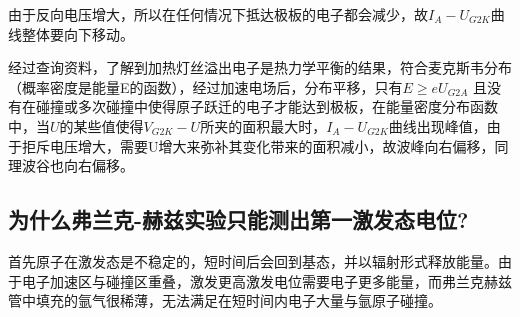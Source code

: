 \documentclass{ctexart}
\begin{document}
由于反向电压增大，所以在任何情况下抵达极板的电子都会减少，故$I_A-U_{G2K}$曲线整体要向下移动。

经过查询资料，了解到加热灯丝溢出电子是热力学平衡的结果，符合麦克斯韦分布（概率密度是能量E的函数），经过加速电场后，分布平移，只有$E \geq e U_{G2A}$ 且没有在碰撞或多次碰撞中使得原子跃迁的电子才能达到极板，在能量密度分布函数中，当$U$的某些值使得$V_{G2K}-U$所夹的面积最大时，$I_A{-}U_{G2K}$曲线出现峰值，由于拒斥电压增大，需要U增大来弥补其变化带来的面积减小，故波峰向右偏移，同理波谷也向右偏移。
\subsection{为什么弗兰克-赫兹实验只能测出第一激发态电位?}
首先原子在激发态是不稳定的，短时间后会回到基态，并以辐射形式释放能量。由于电子加速区与碰撞区重叠，激发更高激发电位需要电子更多能量，而弗兰克赫兹管中填充的氩气很稀薄，无法满足在短时间内电子大量与氩原子碰撞。
\end{document}
